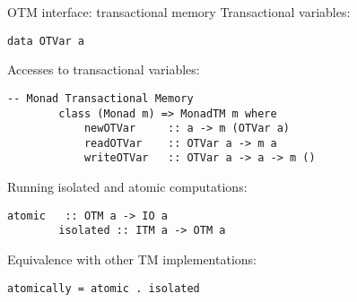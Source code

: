 \documentclass[beamer={noamsthm,10pt},target=bach]{thud}[2014/03/11]
\begin{document}
\begin{frame}[fragile]{OTM interface: transactional memory}
Transactional variables:
\begin{Verbatim}[tabsize=3, gobble=2]
        data OTVar a
\end{Verbatim}
Accesses to transactional variables:
\begin{Verbatim}[tabsize=3, gobble=2]
        -- Monad Transactional Memory
        class (Monad m) => MonadTM m where
            newOTVar     :: a -> m (OTVar a)
            readOTVar    :: OTVar a -> m a
            writeOTVar   :: OTVar a -> a -> m ()
\end{Verbatim}
Running isolated and atomic computations:
\begin{Verbatim}[tabsize=3, gobble=2]
        atomic   :: OTM a -> IO a
        isolated :: ITM a -> OTM a
\end{Verbatim}
Equivalence with other TM implementations:
\begin{Verbatim}[tabsize=3, gobble=2]
        atomically = atomic . isolated
\end{Verbatim}
\end{frame}


\end{document}
